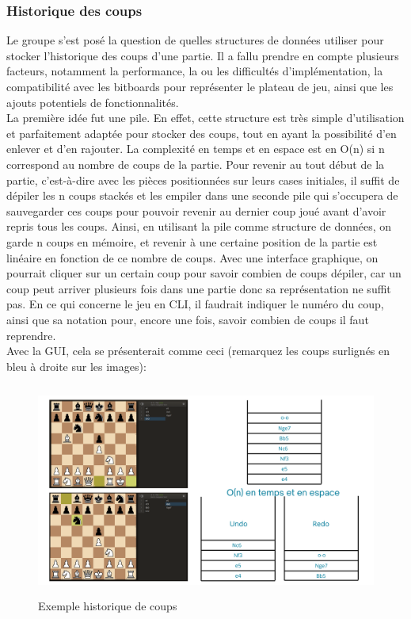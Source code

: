 \documentclass{article}
\begin{document}
\subsubsection{Historique des coups}
\par Le groupe s'est posé la question de quelles structures de données utiliser pour stocker l'historique des coups d'une
partie. Il a fallu prendre en compte plusieurs facteurs, notamment la performance, la ou les difficultés d'implémentation,
la compatibilité avec les bitboards pour représenter le plateau de jeu, ainsi que les ajouts potentiels de fonctionnalités.
\\La première idée fut une pile. En effet, cette structure est très simple d'utilisation et parfaitement adaptée pour stocker
des coups, tout en ayant la possibilité d'en enlever et d'en rajouter. La complexité en temps et en espace est en O(n) si n 
correspond au nombre de coups de la partie. Pour revenir au tout début de la partie, c'est-à-dire avec les pièces positionnées
sur leurs cases initiales, il suffit de dépiler les n coups stackés et les empiler dans une seconde pile qui s'occupera de sauvegarder
ces coups pour pouvoir revenir au dernier coup joué avant d'avoir repris tous les coups. Ainsi, en utilisant la pile comme structure 
de données, on garde n coups en mémoire, et revenir à une certaine position de la partie est linéaire en fonction de ce nombre de coups.
Avec une interface graphique, on pourrait cliquer sur un certain coup pour savoir combien de coups dépiler, car un coup peut arriver
plusieurs fois dans une partie donc sa représentation ne suffit pas. En ce qui concerne le jeu en CLI, il faudrait indiquer le numéro
du coup, ainsi que sa notation pour, encore une fois, savoir combien de coups il faut reprendre.\\
Avec la GUI, cela se présenterait comme ceci (remarquez les coups surlignés en bleu à droite sur les images):

\newpage
\begin{figure}[h]
    \caption{Exemple historique de coups}
    \centering
    \includegraphics[width=\textwidth,height=7.0cm,keepaspectratio]{pile-historique-coups}
\end{figure}
\end{document}
